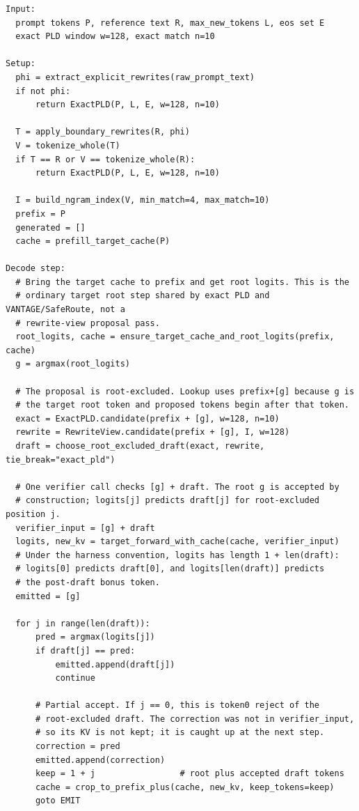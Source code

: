 \documentclass[11pt,a4paper]{article}
\begin{document}
\begin{lstlisting}[basicstyle=\ttfamily\scriptsize,frame=single,caption={The validated two-view instance: VANTAGE with SafeRoute, using Rewrite-View Lookup. In the pseudocode, RewriteView denotes the token index built by Rewrite-View Lookup. The view-based algorithm is greedy-equivalent under an exact deterministic target oracle; implementation audits pass on fp32/eager and fp32/sdpa for the controlled rewrite-view workloads. It does not implement sampling-preserving speculative sampling.},label={alg:frozen}]
Input:
  prompt tokens P, reference text R, max_new_tokens L, eos set E
  exact PLD window w=128, exact match n=10

Setup:
  phi = extract_explicit_rewrites(raw_prompt_text)
  if not phi:
      return ExactPLD(P, L, E, w=128, n=10)

  T = apply_boundary_rewrites(R, phi)
  V = tokenize_whole(T)
  if T == R or V == tokenize_whole(R):
      return ExactPLD(P, L, E, w=128, n=10)

  I = build_ngram_index(V, min_match=4, max_match=10)
  prefix = P
  generated = []
  cache = prefill_target_cache(P)

Decode step:
  # Bring the target cache to prefix and get root logits. This is the
  # ordinary target root step shared by exact PLD and VANTAGE/SafeRoute, not a
  # rewrite-view proposal pass.
  root_logits, cache = ensure_target_cache_and_root_logits(prefix, cache)
  g = argmax(root_logits)

  # The proposal is root-excluded. Lookup uses prefix+[g] because g is
  # the target root token and proposed tokens begin after that token.
  exact = ExactPLD.candidate(prefix + [g], w=128, n=10)
  rewrite = RewriteView.candidate(prefix + [g], I, w=128)
  draft = choose_root_excluded_draft(exact, rewrite, tie_break="exact_pld")

  # One verifier call checks [g] + draft. The root g is accepted by
  # construction; logits[j] predicts draft[j] for root-excluded position j.
  verifier_input = [g] + draft
  logits, new_kv = target_forward_with_cache(cache, verifier_input)
  # Under the harness convention, logits has length 1 + len(draft):
  # logits[0] predicts draft[0], and logits[len(draft)] predicts
  # the post-draft bonus token.
  emitted = [g]

  for j in range(len(draft)):
      pred = argmax(logits[j])
      if draft[j] == pred:
          emitted.append(draft[j])
          continue

      # Partial accept. If j == 0, this is token0 reject of the
      # root-excluded draft. The correction was not in verifier_input,
      # so its KV is not kept; it is caught up at the next step.
      correction = pred
      emitted.append(correction)
      keep = 1 + j                 # root plus accepted draft tokens
      cache = crop_to_prefix_plus(cache, new_kv, keep_tokens=keep)
      goto EMIT


\end{lstlisting}
\end{document}

